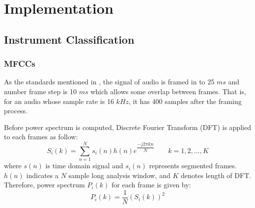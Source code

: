 \documentclass[whitelogo,12pt]{tudelft-report}
\begin{document}
\chapter{Implementation}
\section{Instrument Classification} \label{IC}
\subsection{MFCCs}
As the standards mentioned in \cite{murty2006}, the signal of audio is framed in to 25 $ms$ and number frame step is 10 $ms$ which allows some overlap between frames. That is, for an audio whose sample rate is 16 $kHz$, it has 400 samples after the framing process.

Before power spectrum is computed, Discrete Fourier Transform (DFT) is applied to each frames as follow:
\begin{equation}
S_i(k) = \displaystyle \sum^{N}_{n=1}s_i(n)h(n)e^{\dfrac{-j2\pi kn}{N}} \quad \quad k = 1,2,...,K
\end{equation}
where $s(n)$ is time domain signal and $s_i(n)$ represents segmented frames. $h(n)$ indicates a $N$  sample long analysis window, and $K$ denotes length of DFT. Therefore, power spectrum $P_i(k)$ for each frame is given by:
\begin{equation}
P_i(k) = \dfrac{1}{N}(S_i(k))^2
\end{equation}
\end{document}
